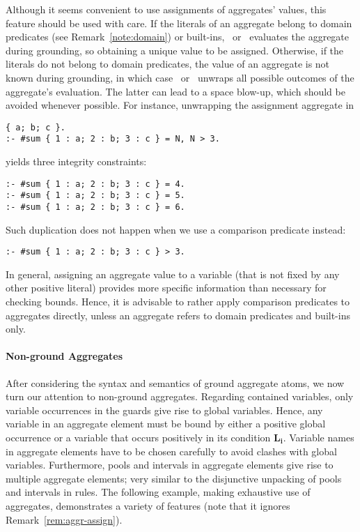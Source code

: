 \begin{note}\label{rem:aggr-assign}
Although it seems convenient to use assignments of aggregates' values,
this feature should be used with care.
If the literals of an aggregate belong to domain predicates (see Remark~\ref{note:domain}) or built-ins,
\gringo\ or \clingo\ evaluates the aggregate during grounding, so obtaining
a unique value to be assigned.
%
%
Otherwise, if the literals do not belong to domain predicates,
the value of an aggregate is not known during grounding,
in which case \gringo\ or \clingo\ unwraps all possible outcomes of the
aggregate's evaluation.
The latter can lead to a space blow-up,
which should be avoided whenever possible.
For instance, unwrapping the assignment aggregate in
\begin{lstlisting}[numbers=none]
{ a; b; c }.
:- #sum { 1 : a; 2 : b; 3 : c } = N, N > 3.
\end{lstlisting}
yields three integrity constraints:
\begin{lstlisting}[numbers=none]
:- #sum { 1 : a; 2 : b; 3 : c } = 4.
:- #sum { 1 : a; 2 : b; 3 : c } = 5.
:- #sum { 1 : a; 2 : b; 3 : c } = 6.
\end{lstlisting}
Such duplication does not happen
when we use a comparison predicate instead:
\begin{lstlisting}[numbers=none]
:- #sum { 1 : a; 2 : b; 3 : c } > 3.
\end{lstlisting}
In general, assigning an aggregate value to a variable
(that is not fixed by any other positive literal)
provides more specific information than necessary for checking bounds.
Hence, it is advisable to rather apply comparison predicates to aggregates directly,
unless an aggregate refers to domain predicates and built-ins only.
\end{note}

\paragraph{Non-ground Aggregates}

After considering the syntax and semantics of ground aggregate atoms,
we now turn our attention to non-ground aggregates.
Regarding contained variables,
only variable occurrences in the guards give rise to global variables.
Hence, any variable in an aggregate element must be bound by
either a positive global occurrence or
a variable that occurs positively in its condition $\boldsymbol{L_i}$.
Variable names in aggregate elements have to be chosen carefully to avoid clashes with global variables.
Furthermore, pools and intervals in aggregate elements give rise to multiple aggregate elements;
very similar to the disjunctive unpacking of pools and intervals in rules.
The following example, making exhaustive use of aggregates,
demonstrates a variety of features
(note that it ignores Remark~\ref{rem:aggr-assign}).

